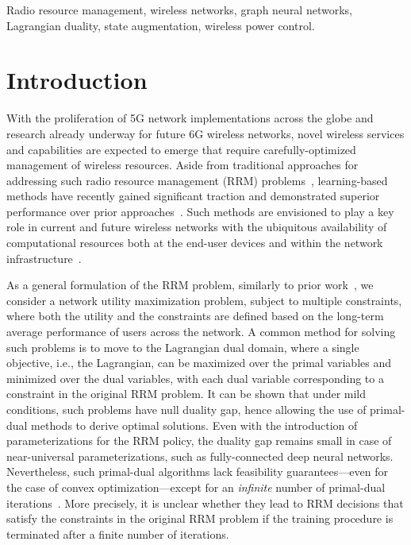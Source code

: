 \documentclass[lettersize,journal]{IEEEtran}
\begin{document}
\begin{IEEEkeywords}
Radio resource management, wireless networks, graph neural networks, Lagrangian duality, state augmentation, wireless power control.
\end{IEEEkeywords}

\section{Introduction}

With the proliferation of 5G network implementations across the globe and research already underway for future 6G wireless networks, novel wireless services and capabilities are expected to emerge that require carefully-optimized management of wireless resources. 
Aside from traditional approaches for addressing such radio resource management (RRM) problems~\cite{shi2011iteratively, wu2013flashlinq, naderializadeh2014itlinq, yi2015itlinq+,shen2017fplinq}, learning-based methods have recently gained significant traction and demonstrated superior performance over prior approaches~\cite{eisen2019learning, nasir2019multi, liang2019deep, eisen2020optimal, shen2020graph, naderializadeh2021resource}. Such methods are envisioned to play a key role in current and future wireless networks with the ubiquitous availability of computational resources both at the end-user devices and within the network infrastructure~\cite{niknam2020intelligent,bonati2021intelligence,letaief2021edge,MediaTek_6G_whitepaper_2022}.

As a general formulation of the RRM problem, similarly to prior work~\cite{ribeiro2012optimal,eisen2019learning, eisen2020optimal, naderializadeh2022learning}, we consider a network utility maximization problem, subject to multiple constraints, where both the utility and the constraints are defined based on the long-term average performance of users across the network. A common method for solving such problems is to move to the Lagrangian dual domain, where a single objective, i.e., the Lagrangian, can be maximized over the primal variables and minimized over the dual variables, with each dual variable corresponding to a constraint in the original RRM problem. It can be shown that under mild conditions, such problems have null duality gap, hence allowing the use of primal-dual methods to derive optimal solutions. Even with the introduction of parameterizations for the RRM policy, the duality gap remains small in case of near-universal parameterizations, such as fully-connected deep neural networks. Nevertheless, such primal-dual algorithms lack feasibility guarantees---even for the case of convex optimization---except for an \emph{infinite} number of primal-dual iterations~\cite{nedic2009subgradient}. More precisely, it is unclear whether they lead to RRM decisions that satisfy the constraints in the original RRM problem if the training procedure is terminated after a finite number of iterations.
\end{document}
